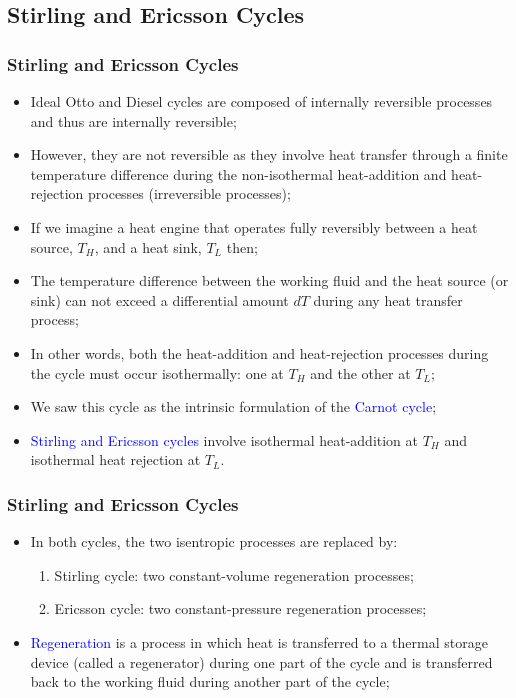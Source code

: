 \documentclass[10pt,compress]{beamer}
\begin{document}
\subsection{Stirling and Ericsson Cycles}
\begin{frame}
 \frametitle{Stirling and Ericsson Cycles}
    \begin{itemize}
     \item <1-> Ideal Otto and Diesel cycles are composed of internally reversible processes and thus are internally reversible;
     \item <2-> However, they are not reversible as they involve heat transfer through a finite temperature difference during the non-isothermal heat-addition and heat-rejection processes (irreversible processes);
     \item <3-> If we imagine a heat engine that operates fully reversibly between a heat source, $T_{H}$, and a heat sink, $T_{L}$ then;
     \item <4-> The temperature difference between the working fluid and the heat source (or sink) can not exceed a differential amount $dT$ during any heat transfer process;
     \item <5-> In other words, both the heat-addition and heat-rejection processes during the cycle must occur isothermally: one at $T_{H}$ and the other at $T_{L}$;
     \item <6-> We saw this cycle as the intrinsic formulation of the \textcolor{blue}{Carnot cycle};
     \item <7-> \textcolor{blue}{Stirling and Ericsson cycles} involve isothermal heat-addition at $T_{H}$ and isothermal heat rejection at $T_{L}$. 
    \end{itemize}
\end{frame}


\begin{frame}
 \frametitle{Stirling and Ericsson Cycles}
    \begin{itemize}
     \item <1-> In both cycles, the two isentropic processes are replaced by:
      \begin{enumerate}
       \item <2-> Stirling cycle: two constant-volume regeneration processes; 
       \item <3-> Ericsson cycle: two constant-pressure regeneration processes;
      \end{enumerate}
     \item <4-> \textcolor{blue}{Regeneration} is a process in which heat is transferred to a thermal storage device (called a regenerator) during one part of the cycle and is transferred back to the working fluid during another part of the cycle;
    \end{itemize}
\end{frame}
\end{document}
